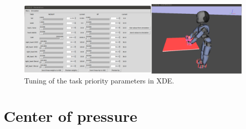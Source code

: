 \documentclass[12pt,a4paper,twoside]{article}
\begin{document}
\begin{figure}[h]
\begin{center}
\includegraphics[width=0.9\hsize]{images/s12.png}
\end{center}
\caption{Tuning of the task priority parameters in XDE.}
\label{fig:params}
\end{figure}




\newpage \appendix

\section{Center of pressure}
\end{document}
